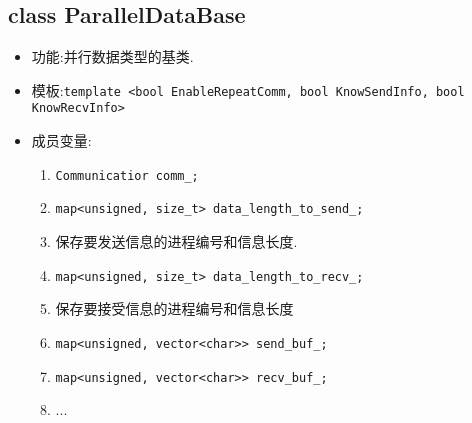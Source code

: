 \documentclass[cn, bibend=bibtex]{elegantpaper}
\theoremstyle{plain}
\begin{document}
\subsection{class ParallelDataBase}
\begin{itemize}
    \item 功能:并行数据类型的基类.
    \item 模板:\lstinline{template <bool EnableRepeatComm, bool KnowSendInfo, bool KnowRecvInfo>}
    \item 成员变量:
    \begin{enumerate}
        \item \lstinline{Communicatior comm_;}
        \item \lstinline|map<unsigned, size_t> data_length_to_send_;|
        \item[] 保存要发送信息的进程编号和信息长度.
        \item \lstinline|map<unsigned, size_t> data_length_to_recv_;|
        \item[] 保存要接受信息的进程编号和信息长度
        \item\lstinline{map<unsigned, vector<char>> send_buf_;}
        \item[]\lstinline{map<unsigned, vector<char>> recv_buf_;}
        \item[]...

\end{enumerate}
\end{itemize}
\end{document}
